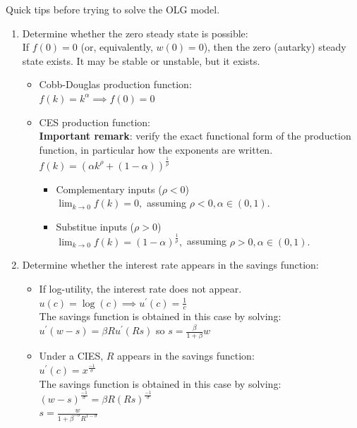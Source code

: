 \documentclass[11pt, a4paper]{article}
\begin{document}
Quick tips before trying to solve the OLG model.
\begin{enumerate}
    \item Determine whether the zero steady state is possible: \\
    If $f(0) = 0$ (or, equivalently, $w(0) = 0$), then the zero (autarky) steady state exists.
    It may be stable or unstable, but it exists.
    \begin{itemize}
    \item Cobb-Douglas production function:\\
    $f(k) = k^\alpha \implies f(0) = 0$
    \item CES production function: \\
        \textbf{Important remark}: verify the exact functional form of the production function, in particular how the exponents are written.\\
        $f(k) = (\alpha k^\rho +(1-\alpha))^\frac{1}{\rho}$
        \begin{itemize}
            \item Complementary inputs ($\rho < 0$)\\
            $\lim_{k \rightarrow 0} f(k) = 0,$ assuming $\rho<0,\alpha \in (0,1).$ 
        \item Substitue inputs ($\rho > 0$)\\
            $\lim_{k \rightarrow 0} f(k) = (1-\alpha)^\frac{1}{\rho},$ assuming $\rho>0,\alpha \in (0,1).$
        \end{itemize}
    \end{itemize}

    \item Determine whether the interest rate appears in the savings function:
        \begin{itemize}
            \item If log-utility, the interest rate does not appear.\\
                $u(c) = \log (c) \implies u^\prime(c) = \frac{1}{c}$ \\
                The savings function is obtained in this case by solving:\\
                $u^\prime(w-s) = \beta R u^\prime(Rs)$ so $s = \frac{\beta}{1+\beta}w$
            \item Under a CIES, $R$ appears in the savings function:\\
                $u^\prime(c) = x^\frac{-1}{\sigma}$ \\
                The savings function is obtained in this case by solving:\\
                $(w-s)^\frac{-1}{\sigma} = \beta R (Rs)^\frac{-1}{\sigma}$ \\
                $s = \frac{w}{1+\beta^{-\sigma}R^{1-\sigma}}$
        \end{itemize}
\end{enumerate}
\end{document}
